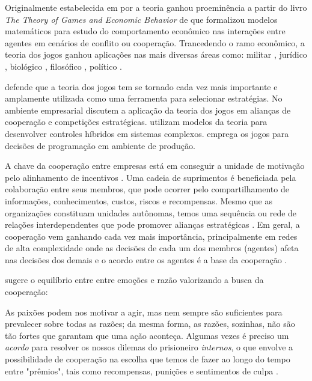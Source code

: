 \documentclass[
	article,			        %
	11pt,				          %
	oneside,			        %
	a4paper,			        %
	english,			        %
	brazil,				        %
	sumario=tradicional
]{abntex2}\usepackage[]{graphicx}\usepackage[]{color}
\begin{document}
Originalmente estabelecida em \citeyear{Cournot.1838} por  a teoria ganhou proeminência a partir do livro \emph{The Theory of Games and Economic Behavior} de  que formalizou modelos matemáticos para estudo do comportamento econômico nas interações entre agentes em cenários de conflito ou cooperação. Trancedendo o ramo econômico, a teoria dos jogos ganhou aplicações nas mais diversas áreas como: militar \cite{Haywood.1954,RAND.2004}, jurídico \cite{Rosa.2014}, biológico \cite{Smith.1982}, filosófico \cite{Lewis.2002}, político \cite{Levy.2003}. 

 defende que a teoria dos jogos tem se tornado cada vez mais importante e amplamente utilizada como uma ferramenta para selecionar estratégias. No ambiente empresarial  discutem a aplicação da teoria dos jogos em alianças de cooperação e competições estratégicas.  utilizam modelos da teoria para desenvolver controles híbridos em sistemas complexos.  emprega os jogos para decisões de programação em ambiente de produção. 

A chave da cooperação entre empresas está em conseguir a unidade de motivação pelo alinhamento de incentivos \cite{Cao.2012}. Uma cadeia de suprimentos é beneficiada pela colaboração entre seus membros, que pode ocorrer pelo compartilhamento de informações, conhecimentos, custos, riscos e recompensas. Mesmo que as organizações constituam unidades autônomas, temos uma sequência ou rede de relações interdependentes que pode promover alianças estratégicas \cite{Chen.2004}. Em geral, a cooperação vem ganhando cada vez mais importância, principalmente em redes de alta complexidade \cite{Drechsel.2010} onde as decisões de cada um dos membros (agentes) afeta nas decisões dos demais e o acordo entre os agentes é a base da cooperação \cite{Young.1994}.

 sugere o equilíbrio entre entre emoções e razão valorizando a busca da cooperação:

\begin{citacao}
  As paixões podem nos motivar a agir, mas nem sempre são suficientes para prevalecer sobre todas as razões; da mesma forma, as razões, sozinhas, não são tão fortes que garantam que uma ação aconteça. Algumas vezes é preciso um \emph{acordo} para resolver os nossos dilemas do prisioneiro \emph{internos}, o que envolve a possibilidade de cooperação na escolha que temos de fazer ao longo do tempo entre "prêmios", tais como recompensas, punições e sentimentos de culpa \cite[p.~132]{Pimentel.2007}.
\end{citacao}
\end{document}
